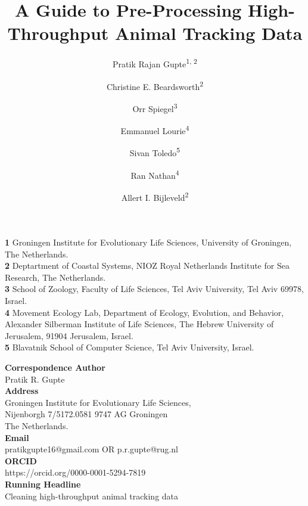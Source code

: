 \documentclass[10pt,paper=a4,headings=standardclasses
]{scrartcl}
\title{A Guide to Pre-Processing High-Throughput Animal Tracking Data}
\date{}
\author{Pratik Rajan Gupte\textsuperscript{1, 2} \and 
Christine E. Beardsworth\textsuperscript{2} \and
Orr Spiegel\textsuperscript{3} \and
Emmanuel Lourie\textsuperscript{4} \and
Sivan Toledo\textsuperscript{5} \and
Ran Nathan\textsuperscript{4} \and
Allert I. Bijleveld\textsuperscript{2}}
\begin{document}

\maketitle


\begin{flushleft}
\bigskip
\textbf{1} Groningen Institute for Evolutionary Life Sciences, University of Groningen, The Netherlands.
\\
\textbf{2} Deptartment of Coastal Systems, NIOZ Royal Netherlands Institute for Sea Research, The Netherlands.
\\
\textbf{3} School of Zoology, Faculty of Life Sciences, Tel Aviv University, Tel Aviv 69978, Israel.
\\
\textbf{4} Movement Ecology Lab, Department of Ecology, Evolution, and Behavior, Alexander Silberman Institute of Life Sciences, The Hebrew University of Jerusalem, 91904 Jerusalem, Israel.
\\
\textbf{5} Blavatnik School of Computer Science, Tel Aviv University, Israel.
\\
\bigskip

\textbf{Correspondence Author}
\\
Pratik R. Gupte
\\
\textbf{Address}
\\
Groningen Institute for Evolutionary Life Sciences, 
\\
Nijenborgh 7/5172.0581 9747 AG Groningen
\\
The Netherlands.
\\
\textbf{Email}
\\
pratikgupte16@gmail.com OR p.r.gupte@rug.nl
\\
\textbf{ORCID}
\\
https://orcid.org/0000-0001-5294-7819
\\
\textbf{Running Headline}
\\
Cleaning high-throughput animal tracking data

\end{flushleft}
\end{document}
